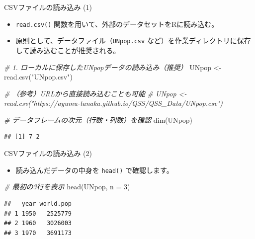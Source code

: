\documentclass[
  ignorenonframetext,
]{beamer}
\newenvironment{Shaded}{\begin{snugshade}}{\end{snugshade}}
\newcommand{\AttributeTok}[1]{\textcolor[rgb]{0.77,0.63,0.00}{#1}}
\newcommand{\CommentTok}[1]{\textcolor[rgb]{0.56,0.35,0.01}{\textit{#1}}}
\newcommand{\DecValTok}[1]{\textcolor[rgb]{0.00,0.00,0.81}{#1}}
\newcommand{\FunctionTok}[1]{\textcolor[rgb]{0.00,0.00,0.00}{#1}}
\newcommand{\NormalTok}[1]{#1}
\newcommand{\OtherTok}[1]{\textcolor[rgb]{0.56,0.35,0.01}{#1}}
\newcommand{\StringTok}[1]{\textcolor[rgb]{0.31,0.60,0.02}{#1}}
\providecommand{\tightlist}{%
  \setlength{\itemsep}{0pt}\setlength{\parskip}{0pt}}
\begin{document}
\begin{frame}[fragile]{CSVファイルの読み込み (1)}
\protect\hypertarget{csvux30d5ux30a1ux30a4ux30ebux306eux8aadux307fux8fbcux307f-1}{}
\begin{itemize}
\tightlist
\item
  \texttt{read.csv()} 関数を用いて、外部のデータセットをRに読み込む。
\item
  原則として、データファイル（\texttt{UNpop.csv}
  など）を作業ディレクトリに保存して読み込むことが推奨される。
\end{itemize}

\scriptsize

\begin{Shaded}
\begin{Highlighting}[]
\CommentTok{\# 1. ローカルに保存したUNpopデータの読み込み（推奨）}
\NormalTok{UNpop }\OtherTok{\textless{}{-}} \FunctionTok{read.csv}\NormalTok{(}\StringTok{"UNpop.csv"}\NormalTok{) }

\CommentTok{\# （参考）URLから直接読み込むことも可能}
\CommentTok{\# UNpop \textless{}{-} read.csv("https://ayumu{-}tanaka.github.io/QSS/QSS\_Data/UNpop.csv")}

\CommentTok{\# データフレームの次元（行数・列数）を確認}
\FunctionTok{dim}\NormalTok{(UNpop)}
\end{Highlighting}
\end{Shaded}

\begin{verbatim}
## [1] 7 2
\end{verbatim}

\normalsize
\end{frame}

\begin{frame}[fragile]{CSVファイルの読み込み (2)}
\protect\hypertarget{csvux30d5ux30a1ux30a4ux30ebux306eux8aadux307fux8fbcux307f-2}{}
\begin{itemize}
\tightlist
\item
  読み込んだデータの中身を \texttt{head()} で確認します。
\end{itemize}

\scriptsize

\begin{Shaded}
\begin{Highlighting}[]
\CommentTok{\# 最初の3行を表示}
\FunctionTok{head}\NormalTok{(UNpop, }\AttributeTok{n =} \DecValTok{3}\NormalTok{)}
\end{Highlighting}
\end{Shaded}

\begin{verbatim}
##   year world.pop
## 1 1950   2525779
## 2 1960   3026003
## 3 1970   3691173
\end{verbatim}

\normalsize
\end{frame}
\end{document}
